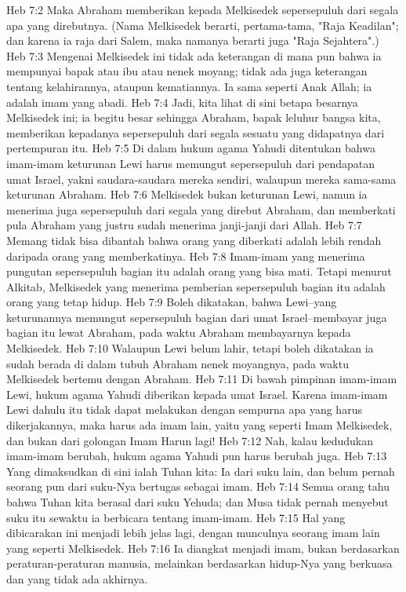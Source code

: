 Heb 7:2  Maka Abraham memberikan kepada Melkisedek sepersepuluh dari segala apa yang direbutnya. (Nama Melkisedek berarti, pertama-tama, "Raja Keadilan"; dan karena ia raja dari Salem, maka namanya berarti juga "Raja Sejahtera".)
Heb 7:3  Mengenai Melkisedek ini tidak ada keterangan di mana pun bahwa ia mempunyai bapak atau ibu atau nenek moyang; tidak ada juga keterangan tentang kelahirannya, ataupun kematiannya. Ia sama seperti Anak Allah; ia adalah imam yang abadi.
Heb 7:4  Jadi, kita lihat di sini betapa besarnya Melkisedek ini; ia begitu besar sehingga Abraham, bapak leluhur bangsa kita, memberikan kepadanya sepersepuluh dari segala sesuatu yang didapatnya dari pertempuran itu.
Heb 7:5  Di dalam hukum agama Yahudi ditentukan bahwa imam-imam keturunan Lewi harus memungut sepersepuluh dari pendapatan umat Israel, yakni saudara-saudara mereka sendiri, walaupun mereka sama-sama keturunan Abraham.
Heb 7:6  Melkisedek bukan keturunan Lewi, namun ia menerima juga sepersepuluh dari segala yang direbut Abraham, dan memberkati pula Abraham yang justru sudah menerima janji-janji dari Allah.
Heb 7:7  Memang tidak bisa dibantah bahwa orang yang diberkati adalah lebih rendah daripada orang yang memberkatinya.
Heb 7:8  Imam-imam yang menerima pungutan sepersepuluh bagian itu adalah orang yang bisa mati. Tetapi menurut Alkitab, Melkisedek yang menerima pemberian sepersepuluh bagian itu adalah orang yang tetap hidup.
Heb 7:9  Boleh dikatakan, bahwa Lewi--yang keturunannya memungut sepersepuluh bagian dari umat Israel--membayar juga bagian itu lewat Abraham, pada waktu Abraham membayarnya kepada Melkisedek.
Heb 7:10  Walaupun Lewi belum lahir, tetapi boleh dikatakan ia sudah berada di dalam tubuh Abraham nenek moyangnya, pada waktu Melkisedek bertemu dengan Abraham.
Heb 7:11  Di bawah pimpinan imam-imam Lewi, hukum agama Yahudi diberikan kepada umat Israel. Karena imam-imam Lewi dahulu itu tidak dapat melakukan dengan sempurna apa yang harus dikerjakannya, maka harus ada imam lain, yaitu yang seperti Imam Melkisedek, dan bukan dari golongan Imam Harun lagi!
Heb 7:12  Nah, kalau kedudukan imam-imam berubah, hukum agama Yahudi pun harus berubah juga.
Heb 7:13  Yang dimaksudkan di sini ialah Tuhan kita: Ia dari suku lain, dan belum pernah seorang pun dari suku-Nya bertugas sebagai imam.
Heb 7:14  Semua orang tahu bahwa Tuhan kita berasal dari suku Yehuda; dan Musa tidak pernah menyebut suku itu sewaktu ia berbicara tentang imam-imam.
Heb 7:15  Hal yang dibicarakan ini menjadi lebih jelas lagi, dengan munculnya seorang imam lain yang seperti Melkisedek.
Heb 7:16  Ia diangkat menjadi imam, bukan berdasarkan peraturan-peraturan manusia, melainkan berdasarkan hidup-Nya yang berkuasa dan yang tidak ada akhirnya.
